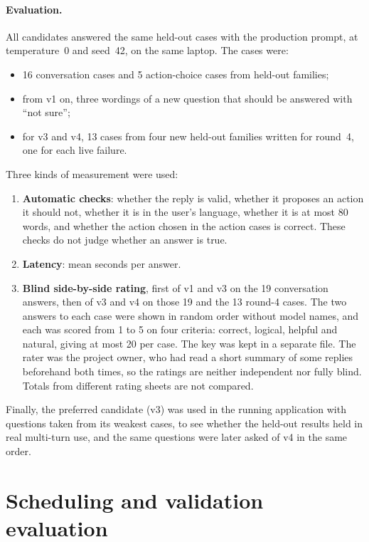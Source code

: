 \paragraph{Evaluation.} All candidates answered the same held-out cases with the production prompt, at temperature~0 and seed~42, on the same laptop. The cases were:
\begin{itemize}
\item 16 conversation cases and 5 action-choice cases from held-out families;
\item from v1 on, three wordings of a new question that should be answered with ``not sure'';
\item for v3 and v4, 13 cases from four new held-out families written for round~4, one for each live failure.
\end{itemize}
Three kinds of measurement were used:
\begin{enumerate}
\item \textbf{Automatic checks}: whether the reply is valid, whether it proposes an action it should not, whether it is in the user's language, whether it is at most 80 words, and whether the action chosen in the action cases is correct. These checks do not judge whether an answer is true.
\item \textbf{Latency}: mean seconds per answer.
\item \textbf{Blind side-by-side rating}, first of v1 and v3 on the 19 conversation answers, then of v3 and v4 on those 19 and the 13 round-4 cases. The two answers to each case were shown in random order without model names, and each was scored from 1 to 5 on four criteria: correct, logical, helpful and natural, giving at most 20 per case. The key was kept in a separate file. The rater was the project owner, who had read a short summary of some replies beforehand both times, so the ratings are neither independent nor fully blind. Totals from different rating sheets are not compared.
\end{enumerate}
Finally, the preferred candidate (v3) was used in the running application with questions taken from its weakest cases, to see whether the held-out results held in real multi-turn use, and the same questions were later asked of v4 in the same order.

\section{Scheduling and validation evaluation}\label{scheduling-validation-and-system-behaviour-evaluation}

